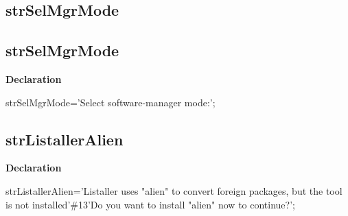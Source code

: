\documentclass{report}
\newif\ifpdf
\begin{document}
\subsection*{\large{\textbf{strSelMgrMode}}\normalsize\hspace{1ex}\hrulefill}
\else
\subsection*{strSelMgrMode}
\fi
\label{trstrings-strSelMgrMode}
\begin{list}{}{
\setlength{\itemindent}{0cm}
\setlength{\listparindent}{0cm}
\setlength{\leftmargin}{\evensidemargin}
\addtolength{\leftmargin}{\tmplength}
\settowidth{\labelsep}{X}
\addtolength{\leftmargin}{\labelsep}
\setlength{\labelwidth}{\tmplength}
}
\item[\textbf{Declaration}\hfill]
\ifpdf
\begin{flushleft}
\fi
\begin{ttfamily}
strSelMgrMode='Select software-manager mode:';\end{ttfamily}

\ifpdf
\end{flushleft}
\fi

\end{list}
\ifpdf
\subsection*{\large{\textbf{strListallerAlien}}\normalsize\hspace{1ex}\hrulefill}
\else
\subsection*{strListallerAlien}
\fi
\label{trstrings-strListallerAlien}
\begin{list}{}{
\setlength{\itemindent}{0cm}
\setlength{\listparindent}{0cm}
\setlength{\leftmargin}{\evensidemargin}
\addtolength{\leftmargin}{\tmplength}
\settowidth{\labelsep}{X}
\addtolength{\leftmargin}{\labelsep}
\setlength{\labelwidth}{\tmplength}
}
\item[\textbf{Declaration}\hfill]
\ifpdf
\begin{flushleft}
\fi
\begin{ttfamily}
strListallerAlien='Listaller uses "alien" to convert foreign packages, but the tool is not installed'{\#}13'Do you want to install "alien" now to continue?';\end{ttfamily}

\ifpdf
\end{flushleft}
\fi

\end{list}
\ifpdf
\end{document}
